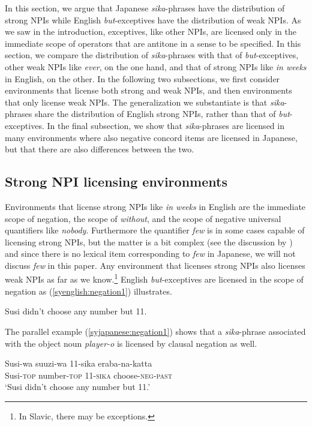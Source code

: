 \documentclass[output=paper]{langscibook}
\begin{document}
In this section, we argue that Japanese \emph{sika}-phrases have the distribution of strong NPIs while English \emph{but}-exceptives have the distribution of weak NPIs. As we  saw in the introduction, exceptives, like other NPIs, are licensed only in the immediate scope of operators that are antitone in a sense to be specified.
In this section, we compare the distribution of \emph{sika}-phrases with that of \emph{but}-exceptives, other weak NPIs like \emph{ever}, on the one hand, and that of strong NPIs like \emph{in weeks} in English, on the other.
In the following two subsections, we first consider environments that license both strong and weak NPIs, and then environments that only license weak NPIs.
The generalization we substantiate is that \emph{sika}-phrases share the distribution of English strong NPIs, rather than that of \emph{but}-exceptives. In the final subsection, we show that \emph{sika}-phrases are licensed in many environments where also negative concord items are licensed in Japanese, but that there are also differences between the two.




\subsection{Strong NPI licensing environments}

Environments that license strong NPIs like \emph{in weeks} in English are the immediate scope of negation, the scope of \emph{without}, and the scope of negative universal quantifiers like \emph{nobody}.  Furthermore the quantifier \emph{few} is in some cases capable of licensing strong NPIs, but the matter is a bit complex (see the discussion by \citealt{chierchia13a}) and since there is no  lexical item corresponding to \emph{few} in Japanese, we will not discuss \emph{few} in this paper. Any environment that licenses strong NPIs also licenses weak NPIs as far as we know.\footnote{In Slavic, there may be exceptions.}  English \emph{but}-exceptives are licensed in the scope of negation as (\ref{syenglish:negation1}) illustrates.

\ea \label{syenglish:negation1}
Susi didn't choose any number but 11.\z

The parallel example (\ref{syjapanese:negation1}) shows that a \emph{sika}-phrase associated with the object noun \emph{player-o} is licensed by clausal negation as well.  

\ea \label{syjapanese:negation1}
\gll Susi-wa suuzi-wa 11-sika eraba-na-katta\\
     Susi-\textsc{top} number-\textsc{top} 11-\textsc{sika} choose-\textsc{neg}-\textsc{past}\\
\glt `Susi didn't choose any number but 11.'\z
\end{document}
